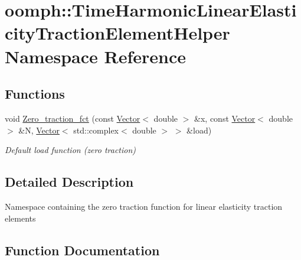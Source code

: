 \hypertarget{namespaceoomph_1_1TimeHarmonicLinearElasticityTractionElementHelper}{}\section{oomph\+:\+:Time\+Harmonic\+Linear\+Elasticity\+Traction\+Element\+Helper Namespace Reference}
\label{namespaceoomph_1_1TimeHarmonicLinearElasticityTractionElementHelper}
\subsection*{Functions}
\begin{DoxyCompactItemize}
\item 
void \hyperlink{namespaceoomph_1_1TimeHarmonicLinearElasticityTractionElementHelper_ac5cbbff3b62966048907d7e0ec99eee4}{Zero\+\_\+traction\+\_\+fct} (const \hyperlink{classoomph_1_1Vector}{Vector}$<$ double $>$ \&x, const \hyperlink{classoomph_1_1Vector}{Vector}$<$ double $>$ \&N, \hyperlink{classoomph_1_1Vector}{Vector}$<$ std\+::complex$<$ double $>$ $>$ \&load)
\begin{DoxyCompactList}\small\item\em Default load function (zero traction) \end{DoxyCompactList}\end{DoxyCompactItemize}


\subsection{Detailed Description}
Namespace containing the zero traction function for linear elasticity traction elements 

\subsection{Function Documentation}
\mbox{\label{namespaceoomph_1_1TimeHarmonicLinearElasticityTractionElementHelper_ac5cbbff3b62966048907d7e0ec99eee4}} 
